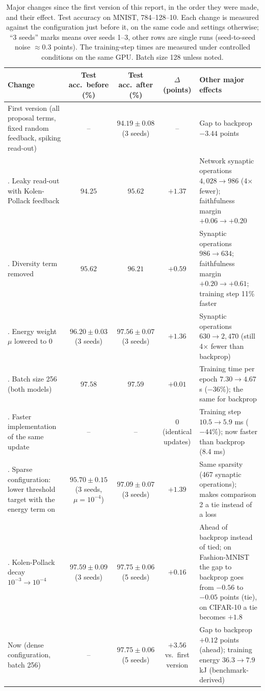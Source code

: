\documentclass{article}
\begin{document}
\begin{table}[H]
\centering
\small
\setlength{\tabcolsep}{4pt}
\caption{Major changes since the first version of this report, in the order they were made, and their effect. Test accuracy on MNIST, 784--128--10. Each change is measured against the configuration just before it, on the same code and settings otherwise; ``3 seeds'' marks means over seeds 1--3, other rows are single runs (seed-to-seed noise $\approx 0.3$ points). The training-step times are measured under controlled conditions on the same GPU. Batch size 128 unless noted.}
\label{tab:changes}
\begin{tabular}{>{\raggedright\arraybackslash}p{4.3cm}ccc>{\raggedright\arraybackslash}p{4.4cm}}
\toprule
Change & Test acc.\ before (\%) & Test acc.\ after (\%) & $\Delta$ (points) & Other major effects \\
\midrule
First version (all proposal terms, fixed random feedback, spiking read-out) & -- & $94.19 \pm 0.08$ (3 seeds) & -- & Gap to backprop $-3.44$ points \\
\midrule
1. Leaky read-out with Kolen-Pollack feedback & $94.25$ & $95.62$ & $+1.37$ & Network synaptic operations $4{,}028 \to 986$ (4$\times$ fewer); faithfulness margin $+0.06 \to +0.20$ \\
2. Diversity term removed & $95.62$ & $96.21$ & $+0.59$ & Synaptic operations $986 \to 634$; faithfulness margin $+0.20 \to +0.61$; training step 11\% faster \\
3. Energy weight $\mu$ lowered to 0 & $96.20 \pm 0.03$ (3 seeds) & $97.56 \pm 0.07$ (3 seeds) & $+1.36$ & Synaptic operations $630 \to 2{,}470$ (still 4$\times$ fewer than backprop) \\
4. Batch size 256 (both models) & $97.58$ & $97.59$ & $+0.01$ & Training time per epoch $7.30 \to 4.67$ s ($-36\%$); the same for backprop \\
5. Faster implementation of the same update & -- & -- & $0$ (identical updates) & Training step $10.5 \to 5.9$ ms ($-44\%$); now faster than backprop (8.4 ms) \\
\midrule
6. Sparse configuration: lower threshold target with the energy term on & $95.70 \pm 0.15$ (3 seeds, $\mu = 10^{-4}$) & $97.09 \pm 0.07$ (3 seeds) & $+1.39$ & Same sparsity (467 synaptic operations); makes comparison 2 a tie instead of a loss \\
7. Kolen-Pollack decay $10^{-3} \to 10^{-4}$ & $97.59 \pm 0.09$ (3 seeds) & $97.75 \pm 0.06$ (5 seeds) & $+0.16$ & Ahead of backprop instead of tied; on Fashion-MNIST the gap to backprop goes from $-0.56$ to $-0.05$ points (tie), on CIFAR-10 a tie becomes $+1.8$ \\
\midrule
Now (dense configuration, batch 256) & -- & $97.75 \pm 0.06$ (5 seeds) & $+3.56$ vs.\ first version & Gap to backprop $+0.12$ points (ahead); training energy $36.3 \to 7.9$ kJ (benchmark-derived) \\
\bottomrule
\end{tabular}
\end{table}
\end{document}
